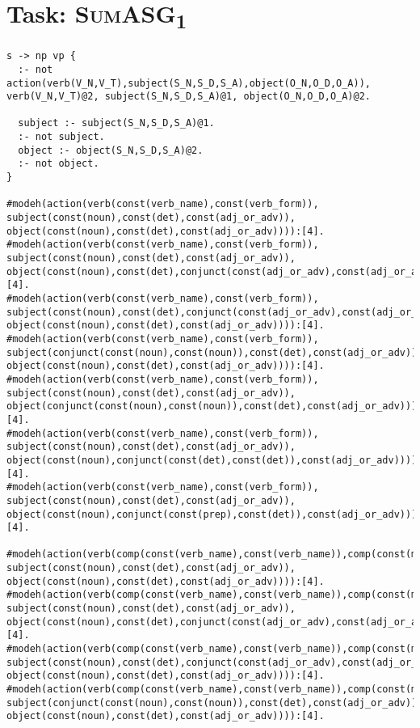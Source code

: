 \vspace{5pt}

\section{Task: \textsc{SumASG\textsubscript{1}}}
\label{sec:appendix_asg_1}

\begin{lstlisting}
s -> np vp {
  :- not action(verb(V_N,V_T),subject(S_N,S_D,S_A),object(O_N,O_D,O_A)), verb(V_N,V_T)@2, subject(S_N,S_D,S_A)@1, object(O_N,O_D,O_A)@2.
  
  subject :- subject(S_N,S_D,S_A)@1.
  :- not subject.
  object :- object(S_N,S_D,S_A)@2.
  :- not object.
}

#modeh(action(verb(const(verb_name),const(verb_form)), subject(const(noun),const(det),const(adj_or_adv)), object(const(noun),const(det),const(adj_or_adv)))):[4].
#modeh(action(verb(const(verb_name),const(verb_form)), subject(const(noun),const(det),const(adj_or_adv)), object(const(noun),const(det),conjunct(const(adj_or_adv),const(adj_or_adv))))):[4].
#modeh(action(verb(const(verb_name),const(verb_form)), subject(const(noun),const(det),conjunct(const(adj_or_adv),const(adj_or_adv))), object(const(noun),const(det),const(adj_or_adv)))):[4].
#modeh(action(verb(const(verb_name),const(verb_form)), subject(conjunct(const(noun),const(noun)),const(det),const(adj_or_adv)), object(const(noun),const(det),const(adj_or_adv)))):[4].
#modeh(action(verb(const(verb_name),const(verb_form)), subject(const(noun),const(det),const(adj_or_adv)), object(conjunct(const(noun),const(noun)),const(det),const(adj_or_adv)))):[4].
#modeh(action(verb(const(verb_name),const(verb_form)), subject(const(noun),const(det),const(adj_or_adv)), object(const(noun),conjunct(const(det),const(det)),const(adj_or_adv)))):[4].
#modeh(action(verb(const(verb_name),const(verb_form)), subject(const(noun),const(det),const(adj_or_adv)), object(const(noun),conjunct(const(prep),const(det)),const(adj_or_adv)))):[4].

#modeh(action(verb(comp(const(verb_name),const(verb_name)),comp(const(main_verb),const(aux_verb))), subject(const(noun),const(det),const(adj_or_adv)), object(const(noun),const(det),const(adj_or_adv)))):[4].
#modeh(action(verb(comp(const(verb_name),const(verb_name)),comp(const(main_verb),const(aux_verb))), subject(const(noun),const(det),const(adj_or_adv)), object(const(noun),const(det),conjunct(const(adj_or_adv),const(adj_or_adv))))):[4].
#modeh(action(verb(comp(const(verb_name),const(verb_name)),comp(const(main_verb),const(aux_verb))), subject(const(noun),const(det),conjunct(const(adj_or_adv),const(adj_or_adv))), object(const(noun),const(det),const(adj_or_adv)))):[4].
#modeh(action(verb(comp(const(verb_name),const(verb_name)),comp(const(main_verb),const(aux_verb))), subject(conjunct(const(noun),const(noun)),const(det),const(adj_or_adv)), object(const(noun),const(det),const(adj_or_adv)))):[4].


\end{lstlisting}
